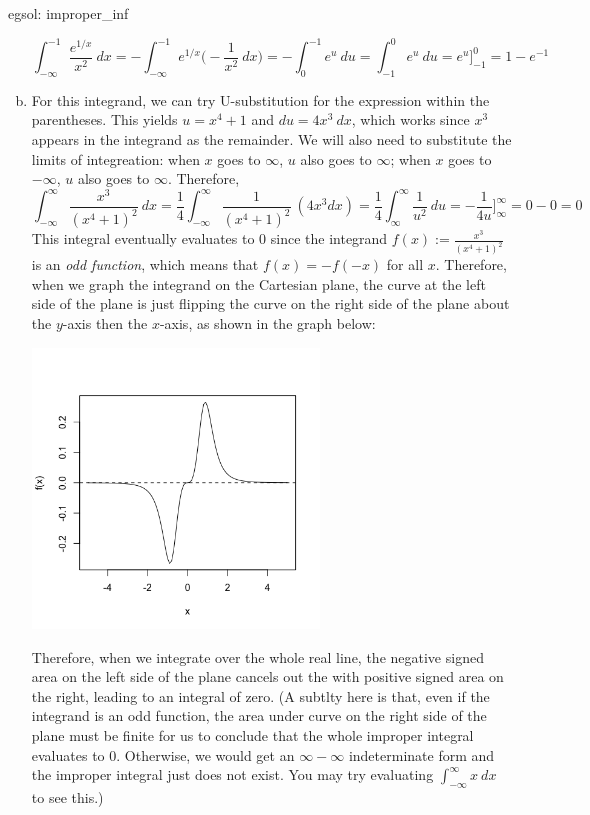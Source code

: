\begin{egsol}[]{egsol: improper_inf}
\begin{enumerate}[a)]
        \[\int_{-\infty}^{-1} \frac{e^{1/x}}{x^2}~dx = -\int_{-\infty}^{-1} e^{1/x}\Big(-\frac{1}{x^2}~dx\Big) = -\int_{0}^{-1} e^u~du = \int_{-1}^0 e^u~du = e^u\Big]_{-1}^0 = 1 - e^{-1}\]
        \item For this integrand, we can try U-substitution for the expression within the parentheses.  This yields $u = x^4+1$ and $du = 4x^3~dx$, which works since $x^3$ appears in the integrand as the remainder.  We will also need to substitute the limits of integreation: when $x$ goes to $\infty$, $u$ also goes to $\infty$; when $x$ goes to $-\infty$, $u$ also goes to $\infty$.  Therefore,
        \[\int_{-\infty}^{\infty} \frac{x^3}{(x^4+1)^2}~dx = \frac{1}{4}\int_{-\infty}^{\infty} \frac{1}{(x^4+1)^2}~(4x^3dx) = \frac{1}{4}\int_{\infty}^{\infty}\frac{1}{u^2}~du = -\frac{1}{4u}\Big]_{\infty}^{\infty} = 0 - 0 = 0\]
        This integral eventually evaluates to $0$ since the integrand $f(x) := \frac{x^3}{(x^4+1)^2}$ is an \textit{odd function}, which means that $f(x) = -f(-x)$ for all $x$.  Therefore, when we graph the integrand on the Cartesian plane, the curve at the left side of the plane is just flipping the curve on the right side of the plane about the $y$-axis then the $x$-axis, as shown in the graph below: 
        \begin{center}
            \includegraphics[trim = {0 0 0 2cm}, clip, width = 0.6\textwidth]{figures/chap 07/odd_function.png}
        \end{center}
        Therefore, when we integrate over the whole real line, the negative signed area on the left side of the plane cancels out the with positive signed area on the right, leading to an integral of zero.  (A subtlty here is that, even if the integrand is an odd function, the area under curve on the right side of the plane must be finite for us to conclude that the whole improper integral evaluates to $0$.  Otherwise, we would get an $\infty - \infty$ indeterminate form and the improper integral just does not exist.  You may try evaluating $\int_{-\infty}^{\infty} x~dx$ to see this.)
    \end{enumerate}
\end{egsol}

